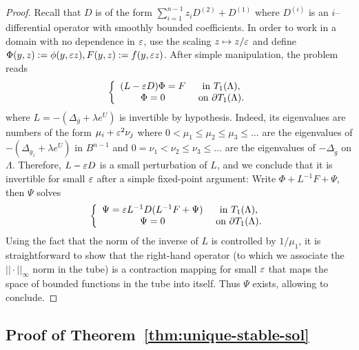\begin{proof}
    Recall that $D$ is of the form $\sum_{i=1}^{n-1} z_{i}D^{(2)}+D^{(1)}$ where
    $D^{(i)}$ is an $i$--differential operator with smoothly bounded
    coefficients. In order to work in a domain with no dependence in $\varepsilon$, use the
    scaling $z\mapsto z/\varepsilon$ and define $\Phi(y,z):=\phi(y,\varepsilon z),
    F(y,z):=f(y,\varepsilon z)$.
    After simple manipulation, the problem reads
    \begin{equation}
        \left\{
            \begin{array}{cc}
                (L-\varepsilon D)\Phi = F& \mbox{ in }T_1(\Lambda),\\
                \Phi=0 & \mbox{ on }\partial T_1(\Lambda).
            \end{array}
        \right.
    \end{equation}
    where $L=-(\Delta_{\bar g} + \lambda e^U)$ is invertible by hypothesis.
    Indeed, its eigenvalues are numbers of the form $\mu_i+\varepsilon^2 \nu_j$ where
    $0<\mu_1\leq \mu_2\leq \mu_3\leq \dots$ are the eigenvalues of
    $-(\Delta_{g_z}+\lambda e^U)$ in $B^{n-1}$ and $0=\nu_1<\nu_2\leq \nu_3\leq
    \dots$ are the eigenvalues of $-\Delta_{\mathring g}$ on $\Lambda$.
    Therefore, $L-\varepsilon D$ is a small perturbation of $L$, and we conclude that
    it is invertible for small $\varepsilon$ after a simple fixed-point argument:
    Write $\Phi+L^{-1}F+\Psi$, then $\Psi$ solves
    \begin{equation}
        \left\{
            \begin{array}{cc}
                \Psi = \varepsilon L^{-1}D(L^{-1}F+\Psi)& \mbox{ in }T_1(\Lambda),\\
                \Psi=0 & \mbox{ on }\partial T_1(\Lambda).
            \end{array}
        \right.
    \end{equation}
    Using the fact that the norm of the inverse of $L$ is controlled by
    $1/\mu_1$, it is straightforward to show that the right-hand operator (to
    which we associate the $||\cdot||_\infty$ norm in the tube) is a
    contraction mapping for small $\varepsilon$ that maps the space of bounded
    functions in the tube into itself. Thus $\Psi$ exists, allowing to conclude.
\end{proof}


\subsection{Proof of Theorem~\ref{thm:unique-stable-sol}}


